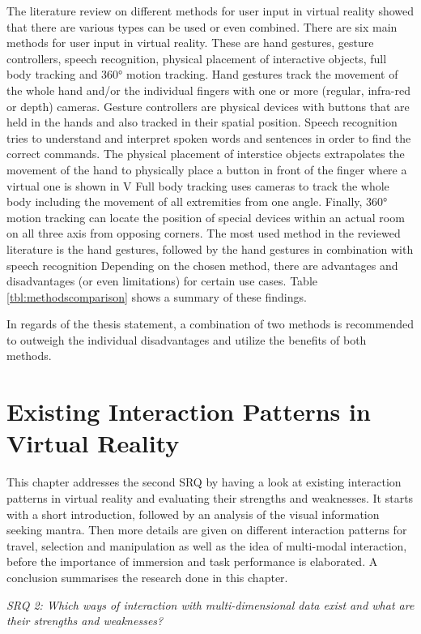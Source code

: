 The literature review on different methods for user input in virtual reality showed that there are various types can be used or even combined. \newline
There are six main methods for user input in virtual reality. These are hand gestures, gesture controllers, speech recognition, physical placement of interactive objects, full body tracking and 360° motion tracking. Hand gestures track the movement of the whole hand and/or the individual fingers with one or more (regular, infra-red or depth) cameras. Gesture controllers are physical devices with buttons that are held in the hands and also tracked in their spatial position. Speech recognition tries to understand and interpret spoken words and sentences in order to find the correct commands. The physical placement of interstice objects extrapolates the movement of the hand to physically place a button in front of the finger where a virtual one is shown in V Full body tracking uses cameras to track the whole body including the movement of all extremities from one angle. Finally, 360° motion tracking can locate the position of special devices within an actual room on all three axis from opposing corners. The most used method in the reviewed literature is the hand gestures, followed by the hand gestures in combination with speech recognition \newline
Depending on the chosen method, there are advantages and disadvantages (or even limitations) for certain use cases. Table \ref{tbl:methodscomparison} shows a summary of these findings.

In regards of the thesis statement, a combination of two methods is recommended to outweigh the individual disadvantages and utilize the benefits of both methods.



\section{Existing Interaction Patterns in Virtual Reality}

\label{SectionLiteratureReviewSRQ2}

This chapter addresses the second SRQ by having a look at existing interaction patterns in virtual reality and evaluating their strengths and weaknesses. It starts with a short introduction, followed by an analysis of the visual information seeking mantra. Then more details are given on different interaction patterns for travel, selection and manipulation as well as the idea of multi-modal interaction, before the importance of immersion and task performance is elaborated. A conclusion summarises the research done in this chapter.
\begin{framed}
	\textit{SRQ 2: Which ways of interaction with multi-dimensional data exist and what are their strengths and weaknesses?}
\end{framed}

